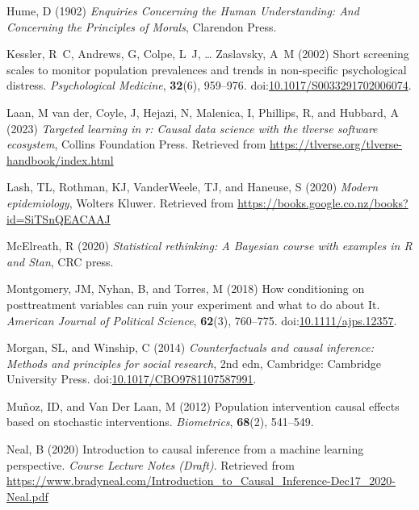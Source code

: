 \documentclass[
  single column]{article}
\newlength{\cslhangindent}
\newenvironment{CSLReferences}[2] %
 {\begin{list}{}{%
  \setlength{\itemindent}{0pt}
  \setlength{\leftmargin}{0pt}
  \setlength{\parsep}{0pt}
  \ifodd #1
   \setlength{\leftmargin}{\cslhangindent}
   \setlength{\itemindent}{-1\cslhangindent}
  \fi
  \setlength{\itemsep}{#2\baselineskip}}}
 {\end{list}}
\begin{document}
\begin{CSLReferences}{1}{0}
Hume, D (1902) \emph{Enquiries Concerning the Human Understanding: And
Concerning the Principles of Morals}, Clarendon Press.

Kessler, R~C, Andrews, G, Colpe, L~J, \ldots{} Zaslavsky, A~M (2002)
Short screening scales to monitor population prevalences and trends in
non-specific psychological distress. \emph{Psychological Medicine},
\textbf{32}(6), 959--976.
doi:\href{https://doi.org/10.1017/S0033291702006074}{10.1017/S0033291702006074}.

Laan, M van der, Coyle, J, Hejazi, N, Malenica, I, Phillips, R, and
Hubbard, A (2023) \emph{Targeted learning in r: Causal data science with
the tlverse software ecosystem}, Collins Foundation Press. Retrieved
from \url{https://tlverse.org/tlverse-handbook/index.html}

Lash, TL, Rothman, KJ, VanderWeele, TJ, and Haneuse, S (2020)
\emph{Modern epidemiology}, Wolters Kluwer. Retrieved from
\url{https://books.google.co.nz/books?id=SiTSnQEACAAJ}

McElreath, R (2020) \emph{Statistical rethinking: A {B}ayesian course
with examples in {R} and {S}tan}, CRC press.

Montgomery, JM, Nyhan, B, and Torres, M (2018) How conditioning on
posttreatment variables can ruin your experiment and what to do about
It. \emph{American Journal of Political Science}, \textbf{62}(3),
760--775.
doi:\href{https://doi.org/10.1111/ajps.12357}{10.1111/ajps.12357}.

Morgan, SL, and Winship, C (2014) \emph{Counterfactuals and causal
inference: Methods and principles for social research}, 2nd edn,
Cambridge: Cambridge University Press.
doi:\href{https://doi.org/10.1017/CBO9781107587991}{10.1017/CBO9781107587991}.

Muñoz, ID, and Van Der Laan, M (2012) Population intervention causal
effects based on stochastic interventions. \emph{Biometrics},
\textbf{68}(2), 541--549.

Neal, B (2020) Introduction to causal inference from a machine learning
perspective. \emph{Course Lecture Notes (Draft)}. Retrieved from
\url{https://www.bradyneal.com/Introduction_to_Causal_Inference-Dec17_2020-Neal.pdf}


\end{CSLReferences}
\end{document}
